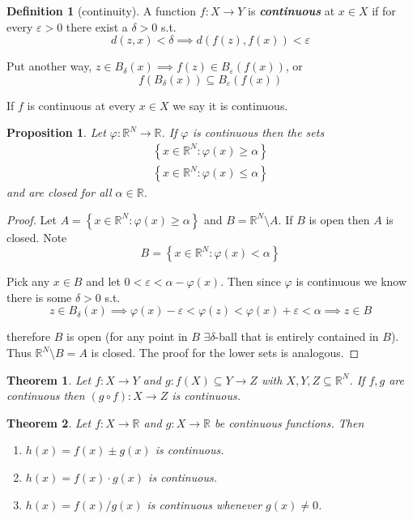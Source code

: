 \documentclass{article}
\newcommand{\R}{\mathbb{R}}
\newcommand{\keyword}[1]{\textit{\textbf{#1}}\index{#1}}
\newtheorem{theorem}{Theorem}
\newtheorem{proposition}{Proposition}
\theoremstyle{definition}
\newtheorem{definition}{Definition}
\begin{document}
\begin{definition}[continuity]\label{def:continuity_continuous}
  A function $f: X \to Y$ is \keyword{continuous} at $x \in X$ if for every $\varepsilon > 0$ there exist a $\delta > 0$ s.t.
  \[
    d(z, x) < \delta
    \implies
    d(f(z), f(x)) < \varepsilon
  \]

  Put another way, $z \in B_{\delta}(x) \implies f(z) \in B_{\varepsilon}(f(x))$, or
  \[
    f(B_{\delta}(x))
    \subseteq
    B_{\varepsilon}(f(x))
  \]

  If $f$ is continuous at every $x \in X$ we say it is continuous.
\end{definition}

\begin{proposition}\label{prop:IVT_lemma}
  Let $\varphi: \mathbb{R}^N \to \mathbb{R}$. If $\varphi$ is continuous then the sets 
  \begin{align*}
      \left\{x \in \mathbb{R}^N: \varphi(x) \ge \alpha\right\} \\
      \left\{x \in \mathbb{R}^N: \varphi(x)\le \alpha\right\}
  \end{align*}
  and are closed for all $\alpha \in \mathbb{R}$.
\end{proposition}

\begin{proof}
  Let $A = \left\{x \in \mathbb{R}^N: \varphi(x) \ge \alpha\right\}$ and $B = \mathbb{R}^N \setminus A$. If $B$ is open then $A$ is closed. Note
  \[
    B = \left\{
      x \in \mathbb{R}^N: \varphi(x) < \alpha
    \right\}
  \]

  Pick any $x \in B$ and let $0 < \varepsilon < \alpha - \varphi(x)$. Then since $\varphi$ is continuous we know there is some $\delta > 0$ s.t.
  \[
    z \in B_{\delta}(x)
    \implies
    \varphi(x) - \varepsilon
    <
    \varphi(z)
    <
    \varphi(x) + \varepsilon
    <
    \alpha
    \implies
    z \in B
  \]

  therefore $B$ is open (for any point in $B$ $\exists \delta$-ball that is entirely contained in $B$). Thus $\mathbb{R}^N \setminus B = A$ is closed. The proof for the lower sets is analogous.
\end{proof}

\begin{theorem}
  Let $f: X \to Y$ and $g: f(X) \subseteq Y \to Z$ with $X, Y, Z \subseteq \R^N$. If $f, g$ are continuous then $(g \circ f): X \to Z$ is continuous.
\end{theorem}

\begin{theorem}
  Let $f: X \to \mathbb{R}$ and $g: X \to \mathbb{R}$ be continuous functions. Then
  \begin{enumerate}
    \item $h(x) = f(x) \pm g(x)$ is continuous.
    \item $h(x) = f(x) \cdot g(x)$ is continuous.
    \item $h(x) = f(x) / g(x)$ is continuous whenever $g(x) \ne 0$.
  \end{enumerate}
\end{theorem}
\end{document}
